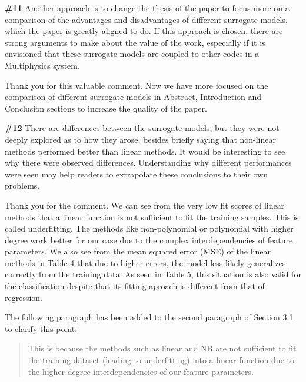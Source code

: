 \documentclass{ar2rc}
\begin{document}

    \Comment \textbf{\#11} Another approach is to change the thesis of the paper to focus
    more on a comparison of the advantages and disadvantages of different
    surrogate models, which the paper is greatly aligned to do. If this
    approach is chosen, there are strong arguments to make about the value of
    the work, especially if it is envisioned that these surrogate models are
    coupled to other codes in a Multiphysics system.

    \Response Thank you for this valuable comment. Now we have more focused on the comparison of different surrogate models in Abstract, Introduction and Conclusion sections to increase the quality of the paper.


    \Comment \textbf{\#12} There are differences between the surrogate models, but they were not deeply explored as to how they arose, besides briefly saying that non-linear methods performed better than linear methods. It would be interesting to see why there were observed differences. Understanding why different performances were seen may help readers to extrapolate these conclusions to their own problems.

    \Response Thank you for the comment. We can see from the very low fit scores of linear methods that a linear function is not sufficient to fit the training samples. This is called underfitting. The methods like non-polynomial or polynomial with higher degree work better for our case due to the complex interdependencies of feature parameters. We also see from the mean squared error (MSE) of the linear methods in Table 4 that due to higher errors, the model less likely generalizes correctly from the training data. As seen in Table 5, this situation is also valid for the classification despite that its fitting aproach is different from that of regression.

    The following paragraph has been added to the second paragraph of Section 3.1 to clarify this point:\\

    \begin{quote}
        This is because the methods such as linear and NB are not sufficient to fit the training dataset (leading to underfitting) into a linear function due to the higher degree interdependencies of our feature parameters.
    \end{quote}

\end{document}
